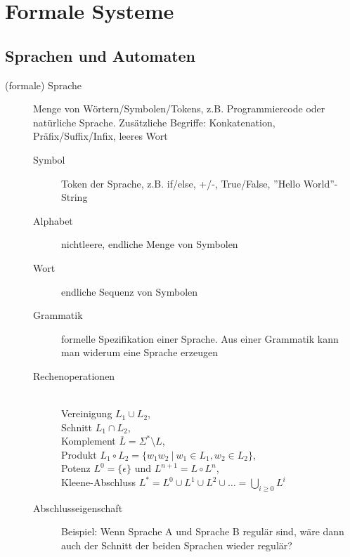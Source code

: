 \section{Formale Systeme}
\subsection{Sprachen und Automaten}
\label{subsec:fs-sprachen-automaten}

\begin{description}
    \item[(formale) Sprache] Menge von Wörtern/Symbolen/Tokens, z.B. Programmiercode oder natürliche Sprache.
        Zusätzliche Begriffe: Konkatenation, Präfix/Suffix/Infix, leeres Wort 
        \begin{description}
            \item[Symbol] Token der Sprache, z.B. if/else, +/-, True/False, ''Hello World''-String
            \item[Alphabet] nichtleere, endliche Menge von Symbolen
            \item[Wort] endliche Sequenz von Symbolen
            \item[Grammatik] formelle Spezifikation einer Sprache. Aus einer Grammatik kann man widerum eine Sprache erzeugen 
            \item[Rechenoperationen] ~ \\
                Vereinigung $L_{1} \cup L_{2}$, \\
                Schnitt $L_{1} \cap L_{2}$, \\
                Komplement $\overline{L} = \Sigma^{*} \setminus L$, \\
                Produkt $L_{1} \circ L_{2} = \{w_{1} w_{2}\ |\ w_{1} \in L_{1}, w_{2} \in L_{2}\}$, \\
                Potenz $L^{0} = \{ \epsilon \}$ und $L^{n+1} = L \circ L^{n}$, \\
                Kleene-Abschluss $L^{*} = L^{0} \cup L^{1} \cup L^{2} \cup \dots = \bigcup_{i \geq 0} L^{i}$

            \item[Abschlusseigenschaft] Beispiel: Wenn Sprache A und Sprache B regulär sind, wäre dann auch der Schnitt der beiden Sprachen wieder regulär? 
        \end{description}


\end{description}
